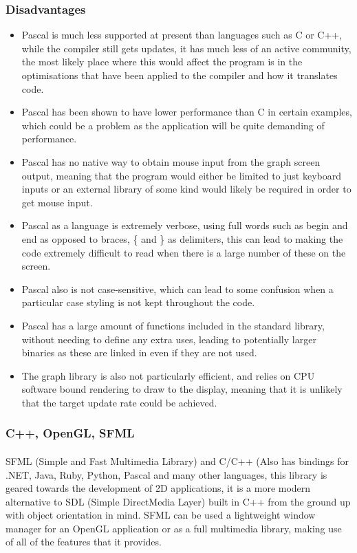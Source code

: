 \subsubsection*{Disadvantages}
\begin{itemize}
\item Pascal is much less supported at present than languages such as C or C++, while the compiler still gets updates, it has much less of an active community, the most likely place where this would affect the program is in the optimisations that have been applied to the compiler and how it translates code.
\item Pascal has been shown to have lower performance than C in certain examples, which could be a problem as the application will be quite demanding of performance.
\item Pascal has no native way to obtain mouse input from the graph screen output, meaning that the program would either be limited to just keyboard inputs or an external library of some kind would likely be required in order to get mouse input.
\item Pascal as a language is extremely verbose, using full words such as begin and end as opposed to braces, \{ and \} as delimiters, this can lead to making the code extremely difficult to read when there is a large number of these on the screen.
\item Pascal also is not case-sensitive, which can lead to some confusion when a particular case styling is not kept throughout the code.
\item Pascal has a large amount of functions included in the standard library, without needing to define any extra uses, leading to potentially larger binaries as these are linked in even if they are not used.
\item The graph library is also not particularly efficient, and relies on CPU software bound rendering to draw to the display, meaning that it is unlikely that the target update rate could be achieved.
\end{itemize}

\pagebreak
\subsubsection{C++, OpenGL, SFML}
\paragraph{}
SFML (Simple and Fast Multimedia Library) and C/C++ (Also has bindings for .NET, Java, Ruby, Python, Pascal and many other languages, this library is geared towards the development of 2D applications, it is a more modern alternative to SDL (Simple DirectMedia Layer) built in C++ from the ground up with object orientation in mind. SFML can be used a lightweight window manager for an OpenGL application or as a full multimedia library, making use of all of the features that it provides.
